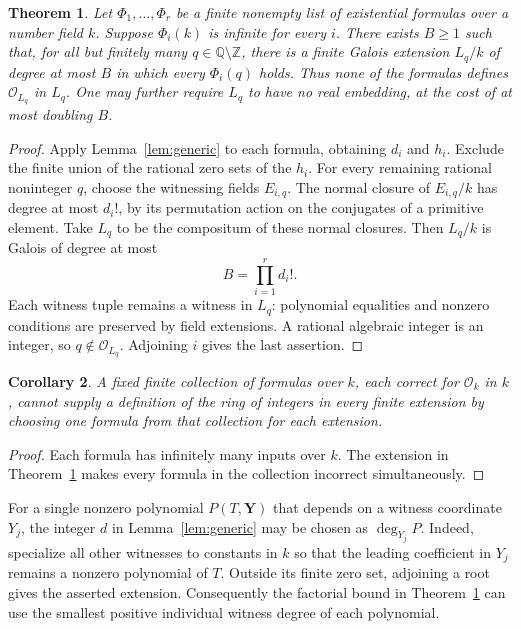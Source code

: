 \documentclass[11pt,a4paper]{article}
\newtheorem{theorem}{Theorem}[section]
\newtheorem{corollary}[theorem]{Corollary}
\theoremstyle{definition}
\newcommand{\Q}{\mathbb Q}
\newcommand{\Z}{\mathbb Z}
\begin{document}
\begin{theorem}\label{thm:finite-menu}
Let $\Phi_1,\ldots,\Phi_r$ be a finite nonempty list of
existential formulas over a number field $k$. Suppose
$\Phi_i(k)$ is infinite for every $i$.
There exists $B\ge1$ such that, for all but finitely many
$q\in\Q\setminus\Z$, there is a finite Galois extension
$L_q/k$ of degree at most $B$ in which every $\Phi_i(q)$ holds.
Thus none of the formulas defines $\mathcal O_{L_q}$ in $L_q$.
One may further require $L_q$ to have no real embedding, at the
cost of at most doubling $B$.
\end{theorem}
\begin{proof}
Apply Lemma~\ref{lem:generic} to each formula, obtaining $d_i$
and $h_i$. Exclude the finite union of the rational zero sets
of the $h_i$. For every remaining rational noninteger $q$,
choose the witnessing fields $E_{i,q}$.
The normal closure of $E_{i,q}/k$ has degree at most $d_i!$,
by its permutation action on the conjugates of a primitive
element. Take $L_q$ to be the compositum of these normal closures.
Then $L_q/k$ is Galois of degree at most
\[
                              B=\prod_{i=1}^r d_i!.
\]
Each witness tuple remains a witness in $L_q$: polynomial
equalities and nonzero conditions are preserved by field
extensions. A rational algebraic integer is an integer, so
$q\notin\mathcal O_{L_q}$. Adjoining $i$ gives the last assertion.
\end{proof}

\begin{corollary}
A fixed finite collection of formulas over $k$, each correct for
$\mathcal O_k$ in $k$, cannot supply a definition of the ring of
integers in every finite extension by choosing one formula from
that collection for each extension.
\end{corollary}
\begin{proof}
Each formula has infinitely many inputs over $k$. The extension
in Theorem~\ref{thm:finite-menu} makes every formula in the
collection incorrect simultaneously.
\end{proof}

For a single nonzero polynomial $P(T,\mathbf Y)$ that depends on
a witness coordinate $Y_j$, the integer $d$ in
Lemma~\ref{lem:generic} may be chosen as $\deg_{Y_j}P$.
Indeed, specialize all other witnesses to constants in $k$
so that the leading coefficient in $Y_j$ remains a nonzero
polynomial of $T$. Outside its finite zero set, adjoining a
root gives the asserted extension. Consequently the factorial
bound in Theorem~\ref{thm:finite-menu} can use the smallest
positive individual witness degree of each polynomial.
\end{document}
